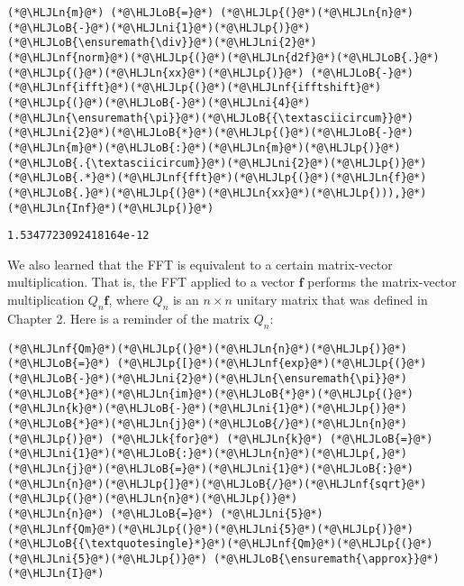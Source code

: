 \documentclass[12pt,landscape]{article}
\newcommand{\HLJLk}[1]{\textcolor[RGB]{148,91,176}{\textbf{#1}}}
\newcommand{\HLJLn}[1]{#1}
\newcommand{\HLJLnf}[1]{\textcolor[RGB]{66,102,213}{#1}}
\newcommand{\HLJLni}[1]{\textcolor[RGB]{59,151,46}{#1}}
\newcommand{\HLJLoB}[1]{\textcolor[RGB]{102,102,102}{\textbf{#1}}}
\newcommand{\HLJLp}[1]{#1}
\begin{document}
{\begin{lstlisting}
(*@\HLJLn{m}@*) (*@\HLJLoB{=}@*) (*@\HLJLp{(}@*)(*@\HLJLn{n}@*)(*@\HLJLoB{-}@*)(*@\HLJLni{1}@*)(*@\HLJLp{)}@*)(*@\HLJLoB{\ensuremath{\div}}@*)(*@\HLJLni{2}@*)
(*@\HLJLnf{norm}@*)(*@\HLJLp{(}@*)(*@\HLJLn{d2f}@*)(*@\HLJLoB{.}@*)(*@\HLJLp{(}@*)(*@\HLJLn{xx}@*)(*@\HLJLp{)}@*) (*@\HLJLoB{-}@*) (*@\HLJLnf{ifft}@*)(*@\HLJLp{(}@*)(*@\HLJLnf{ifftshift}@*)(*@\HLJLp{(}@*)(*@\HLJLoB{-}@*)(*@\HLJLni{4}@*)(*@\HLJLn{\ensuremath{\pi}}@*)(*@\HLJLoB{{\textasciicircum}}@*)(*@\HLJLni{2}@*)(*@\HLJLoB{*}@*)(*@\HLJLp{(}@*)(*@\HLJLoB{-}@*)(*@\HLJLn{m}@*)(*@\HLJLoB{:}@*)(*@\HLJLn{m}@*)(*@\HLJLp{)}@*)(*@\HLJLoB{.{\textasciicircum}}@*)(*@\HLJLni{2}@*)(*@\HLJLp{)}@*) (*@\HLJLoB{.*}@*)(*@\HLJLnf{fft}@*)(*@\HLJLp{(}@*)(*@\HLJLn{f}@*)(*@\HLJLoB{.}@*)(*@\HLJLp{(}@*)(*@\HLJLn{xx}@*)(*@\HLJLp{))),}@*) (*@\HLJLn{Inf}@*)(*@\HLJLp{)}@*)
\end{lstlisting}

\begin{lstlisting}
1.5347723092418164e-12
\end{lstlisting}


We also learned that the FFT is equivalent to a certain matrix-vector multiplication.  That is, the FFT applied to a vector $\mathbf{f}$ performs the matrix-vector multiplication $Q_n \mathbf{f}$, where $Q_n$ is an $n\times n$ unitary matrix that was defined in Chapter 2. Here is a reminder of the matrix $Q_n$:


\begin{lstlisting}
(*@\HLJLnf{Qm}@*)(*@\HLJLp{(}@*)(*@\HLJLn{n}@*)(*@\HLJLp{)}@*) (*@\HLJLoB{=}@*) (*@\HLJLp{[}@*)(*@\HLJLnf{exp}@*)(*@\HLJLp{(}@*)(*@\HLJLoB{-}@*)(*@\HLJLni{2}@*)(*@\HLJLn{\ensuremath{\pi}}@*)(*@\HLJLoB{*}@*)(*@\HLJLn{im}@*)(*@\HLJLoB{*}@*)(*@\HLJLp{(}@*)(*@\HLJLn{k}@*)(*@\HLJLoB{-}@*)(*@\HLJLni{1}@*)(*@\HLJLp{)}@*)(*@\HLJLoB{*}@*)(*@\HLJLn{j}@*)(*@\HLJLoB{/}@*)(*@\HLJLn{n}@*)(*@\HLJLp{)}@*) (*@\HLJLk{for}@*) (*@\HLJLn{k}@*) (*@\HLJLoB{=}@*) (*@\HLJLni{1}@*)(*@\HLJLoB{:}@*)(*@\HLJLn{n}@*)(*@\HLJLp{,}@*) (*@\HLJLn{j}@*)(*@\HLJLoB{=}@*)(*@\HLJLni{1}@*)(*@\HLJLoB{:}@*)(*@\HLJLn{n}@*)(*@\HLJLp{]}@*)(*@\HLJLoB{/}@*)(*@\HLJLnf{sqrt}@*)(*@\HLJLp{(}@*)(*@\HLJLn{n}@*)(*@\HLJLp{)}@*)
(*@\HLJLn{n}@*) (*@\HLJLoB{=}@*) (*@\HLJLni{5}@*)
(*@\HLJLnf{Qm}@*)(*@\HLJLp{(}@*)(*@\HLJLni{5}@*)(*@\HLJLp{)}@*)(*@\HLJLoB{{\textquotesingle}*}@*)(*@\HLJLnf{Qm}@*)(*@\HLJLp{(}@*)(*@\HLJLni{5}@*)(*@\HLJLp{)}@*) (*@\HLJLoB{\ensuremath{\approx}}@*) (*@\HLJLn{I}@*)
\end{lstlisting}

}
\end{document}
